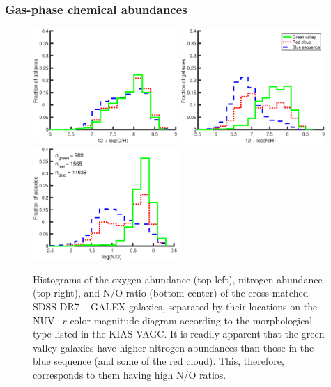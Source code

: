 \subsubsection{Gas-phase chemical abundances}

\begin{figure}
    \includegraphics[width=0.49\textwidth]{Images/GV/Z12logOH_I06relations_t3}
    \includegraphics[width=0.49\textwidth]{Images/GV/N12logNH_I06relations_t3}
    \includegraphics[width=0.49\textwidth]{Images/GV/logNO_I06relations_t3}
    \caption[Distribution of abundances in cross-matched SDSS DR7 -- GALEX 
    galaxies]{Histograms of the oxygen abundance (top left), nitrogen abundance 
    (top right), and N/O ratio (bottom center) of the cross-matched SDSS DR7 -- 
    GALEX galaxies, separated by their locations on the NUV$-r$ color-magnitude 
    diagram according to the morphological type listed in the KIAS-VAGC.  It is 
    readily apparent that the green valley galaxies have higher nitrogen 
    abundances than those in the blue sequence (and some of the red cloud).  
    This, therefore, corresponds to them having high N/O ratios.}
    \label{fig:Z_hist}
\end{figure}

